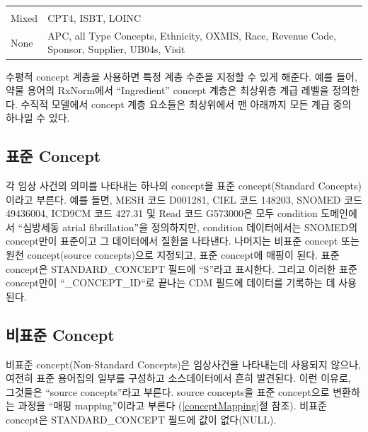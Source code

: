 \documentclass[11pt]{book}
\theoremstyle{definition}
\theoremstyle{definition}
\theoremstyle{definition}
\theoremstyle{remark}
\begin{document}
\begin{longtable}[]{@{}ll@{}}
\begin{minipage}[t]{0.47\columnwidth}
\end{minipage}\tabularnewline
\begin{minipage}[t]{0.13\columnwidth}\raggedright\strut
Mixed\strut
\end{minipage} & \begin{minipage}[t]{0.47\columnwidth}\raggedright\strut
CPT4, ISBT, LOINC\strut
\end{minipage}\tabularnewline
\begin{minipage}[t]{0.13\columnwidth}\raggedright\strut
None\strut
\end{minipage} & \begin{minipage}[t]{0.47\columnwidth}\raggedright\strut
APC, all Type Concepts, Ethnicity, OXMIS, Race, Revenue Code, Sponsor,
Supplier, UB04s, Visit\strut
\end{minipage}\tabularnewline
\bottomrule
\end{longtable}

수평적 concept 계층을 사용하면 특정 계층 수준을 지정할 수 있게 해준다.
예를 들어, 약물 용어의 RxNorm에서 ``Ingredient'' concept 계층은 최상위층
계급 레벨을 정의한다. 수직적 모델에서 concept 계층 요소들은 최상위에서
맨 아래까지 모든 계급 중의 하나일 수 있다.

\subsection{표준 Concept}\label{standardConcepts}

각 임상 사건의 의미를 나타내는 하나의 concept을 표준 concept(Standard
Concepts)이라고 부른다. 예를 들면, MESH 코드 D001281, CIEL 코드 148203,
SNOMED 코드 49436004, ICD9CM 코드 427.31 및 Read 코드 G573000은 모두
condition 도메인에서 ``심방세동 atrial fibrillation''을 정의하지만,
condition 데이터에서는 SNOMED의 concept만이 표준이고 그 데이터에서
질환을 나타낸다. 나머지는 비표준 concept 또는 원천 concept(source
concepts)으로 지정되고, 표준 concept에 매핑이 된다. 표준 concept은
STANDARD\_CONCEPT 필드에 ``S''라고 표시한다. 그리고 이러한
표준concept만이 ``\_CONCEPT\_ID``로 끝나는 CDM 필드에 데이터를 기록하는
데 사용된다. 

\subsection{비표준 Concept}\label{-concept}

비표준 concept(Non-Standard Concepts)은 임상사건을 나타내는데 사용되지
않으나, 여전히 표준 용어집의 일부를 구성하고 소스데이터에서 흔히
발견된다. 이런 이유로, 그것들은 ``source concepts''라고 부른다. source
concepts을 표준 concept으로 변환하는 과정을 ``매핑 mapping''이라고
부른다 (\ref{conceptMapping}절 참조). 비표준 concept은 STANDARD\_CONCEPT
필드에 값이 없다(NULL).
\end{document}
